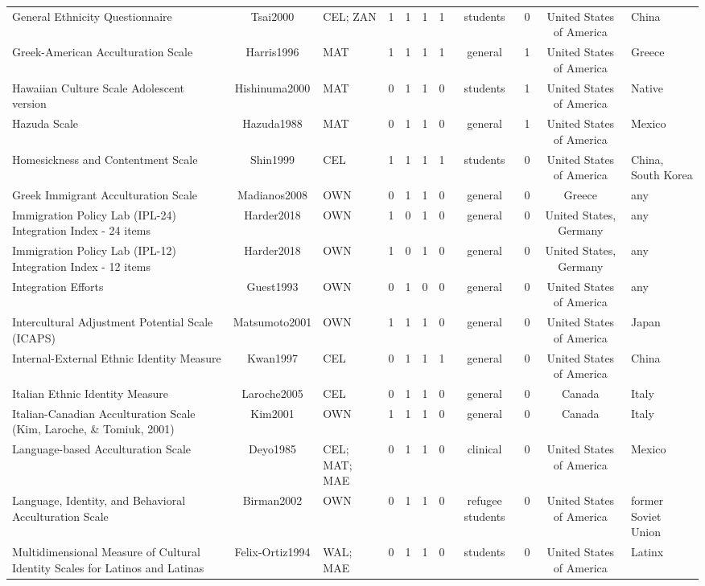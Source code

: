 \begin{longtable}[l]{lclclclclcl}
General Ethnicity Questionnaire & Tsai2000 & CEL; ZAN & 1 & 1 & 1 & 1 & students & 0 & United States of America & China\\
Greek-American Acculturation Scale & Harris1996 & MAT & 1 & 1 & 1 & 1 & general & 1 & United States of America & Greece\\
Hawaiian Culture Scale Adolescent version & Hishinuma2000 & MAT & 0 & 1 & 1 & 0 & students & 1 & United States of America & Native\\
Hazuda Scale & Hazuda1988 & MAT & 0 & 1 & 1 & 0 & general & 1 & United States of America & Mexico\\
Homesickness and Contentment Scale & Shin1999 & CEL & 1 & 1 & 1 & 1 & students & 0 & United States of America & China, South Korea\\
Greek Immigrant Acculturation Scale & Madianos2008 & OWN & 0 & 1 & 1 & 0 & general & 0 & Greece & any\\
Immigration Policy Lab (IPL-24) Integration Index - 24 items & Harder2018 & OWN & 1 & 0 & 1 & 0 & general & 0 & United States, Germany & any\\
Immigration Policy Lab (IPL-12) Integration Index - 12 items & Harder2018 & OWN & 1 & 0 & 1 & 0 & general & 0 & United States, Germany & any\\
Integration Efforts & Guest1993 & OWN & 0 & 1 & 0 & 0 & general & 0 & United States of America & any\\
Intercultural Adjustment Potential Scale (ICAPS) & Matsumoto2001 & OWN & 1 & 1 & 1 & 0 & general & 0 & United States of America & Japan\\
Internal-External Ethnic Identity Measure & Kwan1997 & CEL & 0 & 1 & 1 & 1 & general & 0 & United States of America & China\\
Italian Ethnic Identity Measure & Laroche2005 & CEL & 0 & 1 & 1 & 0 & general & 0 & Canada & Italy\\
Italian-Canadian Acculturation Scale (Kim, Laroche, \& Tomiuk, 2001) & Kim2001 & OWN & 1 & 1 & 1 & 0 & general & 0 & Canada & Italy\\
Language-based Acculturation Scale & Deyo1985 & CEL; MAT; MAE & 0 & 1 & 1 & 0 & clinical & 0 & United States of America & Mexico\\
Language, Identity, and Behavioral Acculturation Scale & Birman2002 & OWN & 0 & 1 & 1 & 0 & refugee students & 0 & United States of America & former Soviet Union\\
Multidimensional Measure of Cultural Identity Scales for Latinos and Latinas & Felix-Ortiz1994 & WAL; MAE & 0 & 1 & 1 & 0 & students & 0 & United States of America & Latinx\\

\end{longtable}
